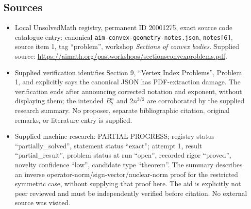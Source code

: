 \documentclass[11pt]{article}
\begin{document}
\subsection{Sources}
\begin{itemize}
\item Local UnsolvedMath registry, permanent ID 20001275, exact source code catalogue entry; canonical \texttt{aim-convex-geometry-notes.json}, \texttt{notes[6]}, source item 1, tag ``problem'', workshop \emph{Sections of convex bodies}. Supplied source: \url{https://aimath.org/pastworkshops/sectionsconvexproblems.pdf}.
\item Supplied verification identifies Section 9, ``Vertex Index Problems'', Problem 1, and explicitly says the canonical JSON has PDF-extraction damage. The verification ends after announcing corrected notation and exponent, without displaying them; the intended $B_2^n$ and $2n^{3/2}$ are corroborated by the supplied research summary. No proposer, separate bibliographic citation, original remarks, or literature entry is supplied.
\item Supplied machine research: PARTIAL-PROGRESS; registry status ``partially\_solved'', statement status ``exact''; attempt 1, result ``partial\_result'', problem status at run ``open'', recorded rigor ``proved'', novelty confidence ``low'', candidate type ``theorem''. The summary describes an inverse operator-norm/sign-vector/nuclear-norm proof for the restricted symmetric case, without supplying that proof here. The aid is explicitly not peer reviewed and must be independently verified before citation. No external source was visited.
\end{itemize}
\end{document}
